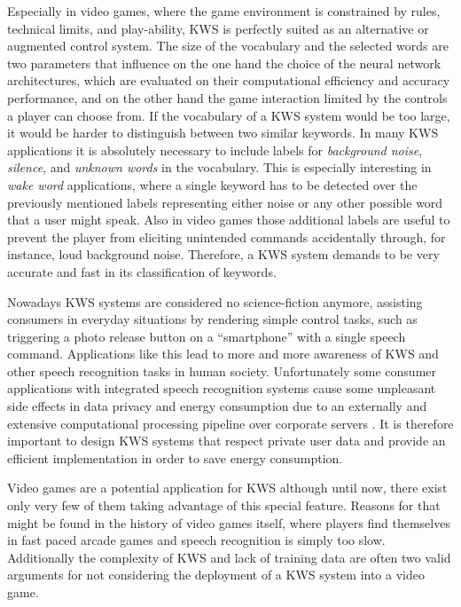 Especially in video games, where the game environment is constrained by rules, technical limits, and play-ability, KWS is perfectly suited as an alternative or augmented control system.
The size of the vocabulary and the selected words are two parameters that influence on the one hand the choice of the neural network architectures, which are evaluated on their computational efficiency and accuracy performance, and on the other hand the game interaction limited by the controls a player can choose from.
If the vocabulary of a KWS system would be too large, it would be harder to distinguish between two similar keywords.
In many KWS applications it is absolutely necessary to include labels for \emph{background noise}, \emph{silence}, and \emph{unknown words} in the vocabulary. 
This is especially interesting in \emph{wake word} applications, where a single keyword has to be detected over the previously mentioned labels representing either noise or any other possible word that a user might speak.
Also in video games those additional labels are useful to prevent the player from eliciting unintended commands accidentally through, for instance, loud background noise.
Therefore, a KWS system demands to be very accurate and fast in its classification of keywords.

Nowadays KWS systems are considered no science-fiction anymore, assisting consumers in everyday situations by rendering simple control tasks, such as triggering a photo release button on a \enquote{smartphone} with a single speech command.
Applications like this lead to more and more awareness of KWS and other speech recognition tasks in human society.
Unfortunately some consumer applications with integrated speech recognition systems cause some unpleasant side effects in data privacy and energy consumption due to an externally and extensive computational processing pipeline over corporate servers \cite{Tang2018}.
It is therefore important to design KWS systems that respect private user data and provide an efficient implementation in order to save energy consumption.

Video games are a potential application for KWS although until now, there exist only very few of them taking advantage of this special feature.
Reasons for that might be found in the history of video games itself, where players find themselves in fast paced arcade games and speech recognition is simply too slow.
Additionally the complexity of KWS and lack of training data are often two valid arguments for not considering the deployment of a KWS system into a video game.

